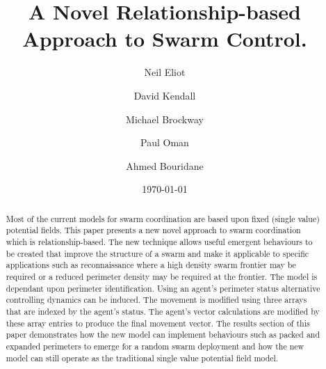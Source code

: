 \documentclass[12pt,a4paper]{IEEEtran}
\title{A Novel Relationship-based Approach to Swarm Control.}
\author[*]{Neil Eliot}
\author[ ]{David Kendall}
\author[ ]{Michael Brockway}
\author[ ]{Paul Oman}
\author[ ]{Ahmed Bouridane}
\affil[ ] {Department of Computer Sciences, Northumbria University}
\affil[*] {Corresponding author: Dr Neil Eliot, neil.eliot@northumbria.ac.uk}
\date{\today}
\begin{document}
\maketitle

\begin{abstract}
Most of the current models for swarm coordination are based upon fixed (single value) potential fields. This paper presents a new novel approach to swarm coordination which is relationship-based. The new technique allows useful emergent behaviours to be created that improve the structure of a swarm and make it applicable to specific applications such as reconnaissance where a high density swarm frontier may be required or a reduced perimeter density may be required at the frontier. The model is dependant upon perimeter identification. Using an agent's perimeter status alternative controlling dynamics can be induced. The movement is modified using three arrays that are indexed by the agent's status. The agent's vector calculations are modified by these array entries to produce the final movement vector. The results section of this paper demonstrates how the new model can implement behaviours such as packed and expanded perimeters to emerge for a random swarm deployment and how the new model can still operate as the traditional single value potential field model.
\end{abstract}
\end{document}
